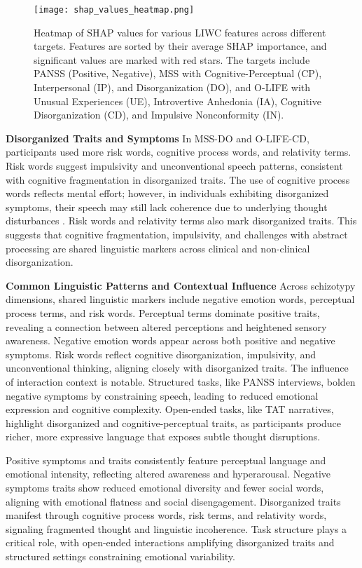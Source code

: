 \documentclass[9pt,a4paper]{rho-class/rho}
\begin{document}
\begin{figure*}[htp] 
    \centering
    \texttt{[image: shap\_values\_heatmap.png]}
    \caption{Heatmap of SHAP values for various LIWC features across different targets. Features are sorted by their average SHAP importance, and significant values are marked with red stars. The targets include PANSS (Positive, Negative), MSS with Cognitive-Perceptual (CP), Interpersonal (IP), and Disorganization (DO), and O-LIFE with Unusual Experiences (UE), Introvertive Anhedonia (IA), Cognitive Disorganization (CD), and Impulsive Nonconformity (IN).}
    \label{fig:shap_values_heatmap}
\end{figure*}



\textbf{Disorganized Traits and Symptoms}
In MSS-DO and O-LIFE-CD, participants used more risk words, cognitive process words, and relativity terms. Risk words suggest impulsivity and unconventional speech patterns, consistent with cognitive fragmentation in disorganized traits. The use of cognitive process words reflects mental effort; however, in individuals exhibiting disorganized symptoms, their speech may still lack coherence due to underlying thought disturbances \cite{chang2022language}. Risk words and relativity terms also mark disorganized traits. This suggests that cognitive fragmentation, impulsivity, and challenges with abstract processing are shared linguistic markers across clinical and non-clinical disorganization.

\textbf{Common Linguistic Patterns and Contextual Influence}
Across schizotypy dimensions, shared linguistic markers include negative emotion words, perceptual process terms, and risk words. Perceptual terms dominate positive traits, revealing a connection between altered perceptions and heightened sensory awareness. Negative emotion words appear across both positive and negative symptoms. Risk words reflect cognitive disorganization, impulsivity, and unconventional thinking, aligning closely with disorganized traits.
The influence of interaction context is notable. Structured tasks, like PANSS interviews, bolden negative symptoms by constraining speech, leading to reduced emotional expression and cognitive complexity. Open-ended tasks, like TAT narratives, highlight disorganized and cognitive-perceptual traits, as participants produce richer, more expressive language that exposes subtle thought disruptions.

Positive symptoms and traits consistently feature perceptual language and emotional intensity, reflecting altered awareness and hyperarousal. Negative symptoms traits show reduced emotional diversity and fewer social words, aligning with emotional flatness and social disengagement. Disorganized traits manifest through cognitive process words, risk terms, and relativity words, signaling fragmented thought and linguistic incoherence. Task structure plays a critical role, with open-ended interactions amplifying disorganized traits and structured settings constraining emotional variability.
\end{document}
